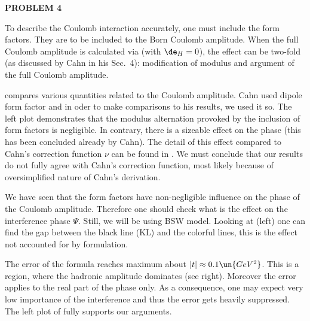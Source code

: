 {\bf PROBLEM 4}

To describe the Coulomb interaction accurately, one must include the form factors. They are to be included to the Born Coulomb amplitude. When the full Coulomb amplitude is calculated via  (with $\de_H=0$), the effect can be two-fold (as discussed by Cahn in his Sec.~4): modification of modulus and argument of the full Coulomb amplitude. 

 compares various quantities related to the Coulomb amplitude. Cahn used dipole form factor and in oder to make comparisons to his results, we used it so. The left plot demonstrates that the modulus alternation provoked by the inclusion of form factors is negligible. In contrary, there is a sizeable effect on the phase (this has been concluded already by Cahn). The detail of this effect compared to Cahn's correction function $\nu$ can be found in . We must conclude that our results do not fully agree with Cahn's correction function, most likely because of oversimplified nature of Cahn's derivation.



We have seen that the form factors have non-negligible influence on the phase of the Coulomb amplitude. Therefore one should check what is the effect on the interference phase $\Psi$. Still, we will be using BSW model. Looking at  (left) one can find the gap between the black line (KL) and the colorful lines, this is the effect not accounted for by \KL{} formulation.


The error of the \KL{} formula reaches maximum about $|t|\approx 0.1\un{GeV^2}$. This is a region, where the hadronic amplitude dominates (see  right). Moreover the error applies to the real part of the phase only. As a consequence, one may expect very low importance of the interference and thus the error gets heavily suppressed. The left plot of  fully supports our arguments.


